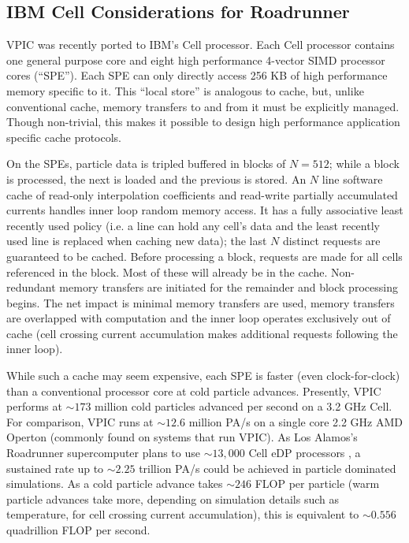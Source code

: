 \documentclass[aps,prl,preprint,preprintnumbers,groupedaddress]{revtex4}
\begin{document}
\subsection{IBM Cell Considerations for Roadrunner}

VPIC was recently ported to IBM's Cell processor.  Each Cell processor
contains one general purpose core and eight high performance 4-vector
SIMD processor cores (``SPE'').  Each SPE can only directly access 256
KB of high performance memory specific to it.  This ``local store'' is
analogous to cache, but, unlike conventional cache, memory transfers
to and from it must be explicitly managed.  Though non-trivial, this
makes it possible to design high performance application specific
cache protocols. \cite{Kahle_et_al_2005}

On the SPEs, particle data is tripled buffered in blocks of $N=512$;
while a block is processed, the next is loaded and the previous is
stored.  An $N$ line software cache of read-only interpolation
coefficients and read-write partially accumulated currents handles
inner loop random memory access.  It has a fully associative least
recently used policy (i.e. a line can hold any cell's data and the
least recently used line is replaced when caching new data); the last
$N$ distinct requests are guaranteed to be cached.  Before processing
a block, requests are made for all cells referenced in the block.
Most of these will already be in the cache.  Non-redundant memory
transfers are initiated for the remainder and block processing begins.
The net impact is minimal memory transfers are used, memory transfers
are overlapped with computation and the inner loop operates
exclusively out of cache (cell crossing current accumulation makes
additional requests following the inner loop).

While such a cache may seem expensive, each SPE is faster (even
clock-for-clock) than a conventional processor core at cold particle
advances.  Presently, VPIC performs at $\sim 173$ million cold
particles advanced per second on a 3.2 GHz Cell.  For comparison, VPIC
runs at $\sim 12.6$ million PA/s on a single core 2.2 GHz AMD Operton
(commonly found on systems that run VPIC).  As Los Alamos's Roadrunner
supercomputer plans to use $\sim 13,000$ Cell eDP processors
\cite{Koch_2006}, a sustained rate up to $\sim 2.25$ trillion PA/s
could be achieved in particle dominated simulations.  As a cold
particle advance takes $\sim 246$ FLOP per particle (warm particle
advances take more, depending on simulation details such as
temperature, for cell crossing current accumulation), this is
equivalent to $\sim 0.556$ quadrillion FLOP per second.
\end{document}
